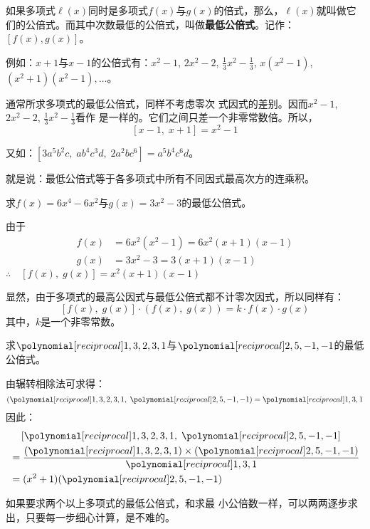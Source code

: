 如果多项式$\ell(x)$同时是多项式$f(x)$与$g(x)$的倍式，那么，$\ell(x)$就叫做它们的公倍式。而其中次数最低的公倍式，叫做\textbf{最低公倍式}。记作：$[f(x),g(x)]$。

例如：$x+1$与$x-1$的公倍式有：$x^2-1$, $2x^2-2$, $\frac{1}{3}x^2-\frac{1}{3}$, $x (x^2-1)$, $(x^2+1)(x^2-1),\ldots$。

通常所求多项式的最低公倍式，同样不考虑零次
式因式的差别。因而$x^2-1$, $2x^2-2$, $\frac{1}{3}x^2-\frac{1}{3}$看作
是一样的。它们之间只差一个非零常数倍。所以，
\[[x-1,\; x+1]=x^2-1\]

又如：$[3a^5b^2c,\; ab^4c^3d,\; 2a^2bc^6]=a^5b^4c^6d$。

就是说：最低公倍式等于各多项式中所有不同因式最高次方的连乘积。

\begin{example}
求$f(x)=6x^4-6x^2$与$g(x)=3x^2-3$的最低公倍式。
\end{example}

\begin{solution}
由于
\[\begin{split}
    f(x)&=6x^2(x^2-1)=6x^2(x+1)(x-1)\\
    g(x)&=3x^2-3=3(x+1)(x-1)
\end{split}\]
$\therefore\quad [f(x),\; g(x)]=x^2(x+1)(x-1)$
\end{solution}

显然，由于多项式的最高公因式与最低公倍式都不计零次因式，所以同样有：
\[[f (x) ,\; g (x) ] \cdot  (f (x) ,\; g (x) ) =k\cdot f (x) \cdot g (x) \]
其中，$k$是一个非零常数。

\begin{example}
求$\poly{1,3,2,3,1}$与$\poly{2,5,-1,-1}$的最低公倍式。
\end{example}

\begin{solution}
由辗转相除法可求得：
\[\left(\poly{1,3,2,3,1}, \; \poly{2,5,-1,-1}\right)=\poly{1,3,1}\]
因此：
\[\begin{split}
    &\quad \left[\poly{1,3,2,3,1}, \; \poly{2,5,-1,-1}\right]\\
    &=\frac{(\poly{1,3,2,3,1})\x (\poly{2,5,-1,-1})}{\poly{1,3,1}}\\
    &=(x^2+1)(\poly{2,5,-1,-1})
\end{split}\]

如果要求两个以上多项式的最低公倍式，和求最
小公倍数一样，可以两两逐步求出，只要每一步细心计算，是不难的。
\end{solution}




